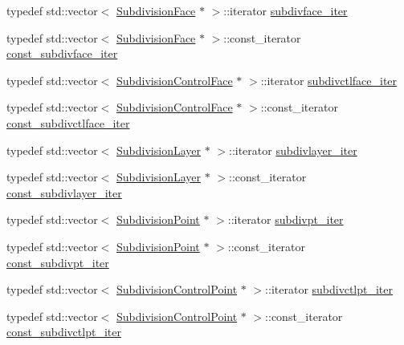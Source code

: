 \begin{DoxyCompactItemize}
\item 
typedef std\+::vector$<$ \hyperlink{classShipCAD_1_1SubdivisionFace}{Subdivision\+Face} $\ast$ $>$\+::iterator \hyperlink{namespaceShipCAD_a14b9ceea38e54192b32764021161d199}{subdivface\+\_\+iter}
\item 
typedef std\+::vector$<$ \hyperlink{classShipCAD_1_1SubdivisionFace}{Subdivision\+Face} $\ast$ $>$\+::const\+\_\+iterator \hyperlink{namespaceShipCAD_a6371e9995f829935912575008f969c1c}{const\+\_\+subdivface\+\_\+iter}
\item 
typedef std\+::vector$<$ \hyperlink{classShipCAD_1_1SubdivisionControlFace}{Subdivision\+Control\+Face} $\ast$ $>$\+::iterator \hyperlink{namespaceShipCAD_a10428817114540e55d0c0b8668cb2579}{subdivctlface\+\_\+iter}
\item 
typedef std\+::vector$<$ \hyperlink{classShipCAD_1_1SubdivisionControlFace}{Subdivision\+Control\+Face} $\ast$ $>$\+::const\+\_\+iterator \hyperlink{namespaceShipCAD_a18309973422a59f794be8aa48b9048e8}{const\+\_\+subdivctlface\+\_\+iter}
\item 
typedef std\+::vector$<$ \hyperlink{classShipCAD_1_1SubdivisionLayer}{Subdivision\+Layer} $\ast$ $>$\+::iterator \hyperlink{namespaceShipCAD_a2e2f532082837a6a283b3660d991a974}{subdivlayer\+\_\+iter}
\item 
typedef std\+::vector$<$ \hyperlink{classShipCAD_1_1SubdivisionLayer}{Subdivision\+Layer} $\ast$ $>$\+::const\+\_\+iterator \hyperlink{namespaceShipCAD_a269f54ad41c7de4f7862170413569d4d}{const\+\_\+subdivlayer\+\_\+iter}
\item 
typedef std\+::vector$<$ \hyperlink{classShipCAD_1_1SubdivisionPoint}{Subdivision\+Point} $\ast$ $>$\+::iterator \hyperlink{namespaceShipCAD_a61bebf1ead1dfa9fc86ab99b1025f66a}{subdivpt\+\_\+iter}
\item 
typedef std\+::vector$<$ \hyperlink{classShipCAD_1_1SubdivisionPoint}{Subdivision\+Point} $\ast$ $>$\+::const\+\_\+iterator \hyperlink{namespaceShipCAD_ac2eb7686c5b725b6d2853c95bbd0a1f9}{const\+\_\+subdivpt\+\_\+iter}
\item 
typedef std\+::vector$<$ \hyperlink{classShipCAD_1_1SubdivisionControlPoint}{Subdivision\+Control\+Point} $\ast$ $>$\+::iterator \hyperlink{namespaceShipCAD_ae33d2f365316a630ce7c1eb7a889e36a}{subdivctlpt\+\_\+iter}
\item 
typedef std\+::vector$<$ \hyperlink{classShipCAD_1_1SubdivisionControlPoint}{Subdivision\+Control\+Point} $\ast$ $>$\+::const\+\_\+iterator \hyperlink{namespaceShipCAD_a8d30ac0ddba81aebfbe0589c7d25434e}{const\+\_\+subdivctlpt\+\_\+iter}
\end{DoxyCompactItemize}
